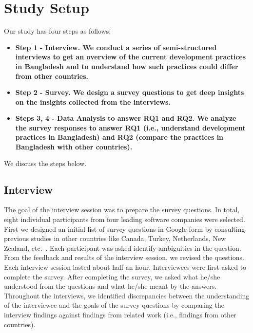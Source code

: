 \section{Study Setup}
\label{study_setup}

Our study has four steps as follows:
\begin{itemize}[leftmargin=10pt]
  \item\bf{Step 1 - Interview.}  We conduct a series of semi-structured interviews to get an overview of the current development practices in Bangladesh and to understand how 
  such practices could differ from other countries.
  \item\bf{Step 2 - Survey.} We design a survey questions to get deep insights on the insights collected from the interviews. 
  \item\bf{Steps 3, 4 - Data Analysis to answer RQ1 and RQ2.} We analyze the survey responses to answer RQ1 (i.e., understand development practices in Bangladesh) and RQ2 (compare the practices in Bangladesh with other countries).
\end{itemize} We discuss the steps below.
\subsection{Interview}
The goal of
the interview session was to prepare the survey questions. In
total, eight individual participants from four leading software companies were
selected. First we designed an initial list of survey questions in Google form by consulting previous studies in other countries like 
Canada, Turkey, Netherlands, New Zealand, etc.~\cite{Garousi2013, Garousi2015, Vonken2012, Wang2018}. Each
participant was asked
identify ambiguities in the question. From the feedback and results of the
interview session, we revised the questions. Each interview session lasted about half an hour. 
Interviewees were first asked to complete the survey.
After completing the survey, we asked what he/she understood from the questions
and what he/she meant by the answers. Throughout the interviews, we identified
discrepancies between the understanding of the interviewee and the goals of the
survey questions by comparing the interview findings against findings from related work (i.e., findings from other countries). 



